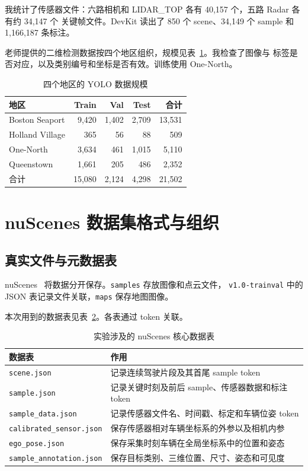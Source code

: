 \documentclass[UTF8,zihao=5,scheme=chinese]{ctexart}
\begin{document}
我统计了传感器文件：六路相机和 LIDAR\_TOP 各有 40,157 个，五路 Radar 各有约 34,147 个
关键帧文件。DevKit 读出了 850 个 scene、34,149 个 sample 和 1,166,187 条标注。

老师提供的二维检测数据按四个地区组织，规模见表~\ref{tab:yolo-data}。我检查了图像与
标签是否对应，以及类别编号和坐标是否有效。训练使用 One-North。

\begin{table}[htbp]
  \centering
  \caption{四个地区的 YOLO 数据规模}
  \label{tab:yolo-data}
  \begin{tabular}{lrrrr}
    \toprule
    地区 & Train & Val & Test & 合计 \\
    \midrule
    Boston Seaport & 9,420 & 1,402 & 2,709 & 13,531 \\
    Holland Village & 365 & 56 & 88 & 509 \\
    One-North & 3,634 & 461 & 1,015 & 5,110 \\
    Queenstown & 1,661 & 205 & 486 & 2,352 \\
    \midrule
    合计 & 15,080 & 2,124 & 4,298 & 21,502 \\
    \bottomrule
  \end{tabular}
\end{table}

\section{nuScenes 数据集格式与组织}

\subsection{真实文件与元数据表}

nuScenes~\cite{nuscenes} 将数据分开保存。\texttt{samples} 存放图像和点云文件，
\texttt{v1.0-trainval} 中的 JSON 表记录文件关联，\texttt{maps} 保存地图图像。

本次用到的数据表见表~\ref{tab:nuscenes-tables}。各表通过 token 关联。

\begin{table}[htbp]
  \centering
  \caption{实验涉及的 nuScenes 核心数据表}
  \label{tab:nuscenes-tables}
  \begin{tabularx}{\linewidth}{lX}
    \toprule
    数据表 & 作用 \\
    \midrule
    \texttt{scene.json} & 记录连续驾驶片段及其首尾 sample token \\
    \texttt{sample.json} & 记录关键时刻及前后 sample、传感器数据和标注 token \\
    \texttt{sample\_data.json} & 记录传感器文件名、时间戳、标定和车辆位姿 token \\
    \texttt{calibrated\_sensor.json} & 保存传感器相对车辆坐标系的外参以及相机内参 \\
    \texttt{ego\_pose.json} & 保存采集时刻车辆在全局坐标系中的位置和姿态 \\
    \texttt{sample\_annotation.json} & 保存目标类别、三维位置、尺寸、姿态和可见度 \\
    \bottomrule
  \end{tabularx}
\end{table}
\end{document}
